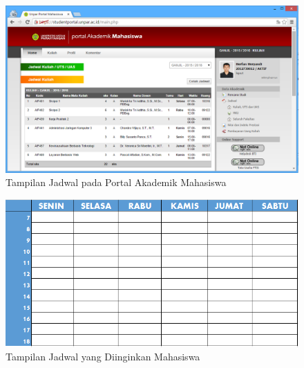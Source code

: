 \begin{enumerate}
		\begin{figure}[H]
			\centering
			\includegraphics[scale=0.5]{Gambar/jadwal-portal}
			\caption{Tampilan Jadwal pada Portal Akademik Mahasiswa} 
			\label{fig:3_jadwal_portal}
		\end{figure}
		
		\begin{figure}[H]
			\centering
			\includegraphics[scale=0.5]{Gambar/jadwal-rekap}
			\caption{Tampilan Jadwal yang Diinginkan Mahasiswa} 
			\label{fig:3_jadwal_rekap}
		\end{figure}
		

\end{enumerate}

